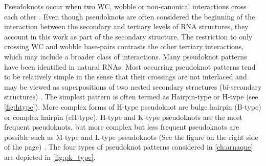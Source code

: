 Pseudoknots occur when two \ac{WC}, wobble or non-canonical interactions cross each other \cite{beyongWCpairs}. Even though pseudoknots are often considered the beginning of the interaction between the secondary and tertiary levels of \ac{RNA} structures, they account in this work as part of the secondary structure. The restriction to only crossing \ac{WC} and wobble base-pairs contrasts the other tertiary interactions, which may include a broader class of interactions. 
Many pseudoknot patterns have been identified in natural \acp{RNA}. Most occurring pseudoknot
patterns tend to be relatively simple in the sense that their crossings are not interlaced and may be viewed as superpositions of two nested secondary structures (bi-secondary structures) \cite{haslinger_rna_1999}. The simplest pattern is often termed as Hairpin-type or H-type (see \autoref{fig:htype}). More complex forms of H-type pseudoknot are bulge hairpin (B-type) or complex hairpin (cH-type). H-type and K-type pseudoknots are the most frequent pseudoknots, but more complex but less frequent pseudoknots are possible such as M-type and L-type pseudoknots (See the figure on the right side of the page) \cite{kucharik_pseudoknots_2016}. The four types of pseudoknot patterns considered in \autoref{ch:arnaque} are depicted in \autoref{fig:pk_type}. 

